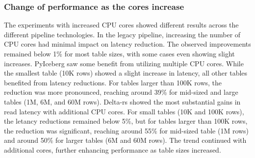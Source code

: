 \subsubsection*{Change of performance as the  cores increase}
The experiments with increased \gls{CPU} cores showed different results across the different pipeline technologies. In the legacy pipeline, increasing the number of \gls{CPU} cores had minimal impact on latency reduction. The observed improvements remained below 1\% for most table sizes, with some cases even showing slight increases.
PyIceberg saw some benefit from utilizing multiple \gls{CPU} cores. While the smallest table (10K rows) showed a slight increase in latency, all other tables benefited from latency reductions. For tables larger than 100K rows, the reduction was more pronounced, reaching around 39\% for mid-sized and large tables (1M, 6M, and 60M rows).
Delta-rs showed the most substantial gains in read latency with additional CPU cores. For small tables (10K and 100K rows), the letancy reductions remained below 5\%, but for tables larger than 100K rows, the reduction was significant, reaching around 55\% for mid-sized table (1M rows) and around 50\% for larger tables (6M and 60M rows).
The trend continued with additional cores, further enhancing performance as table sizes increased.



